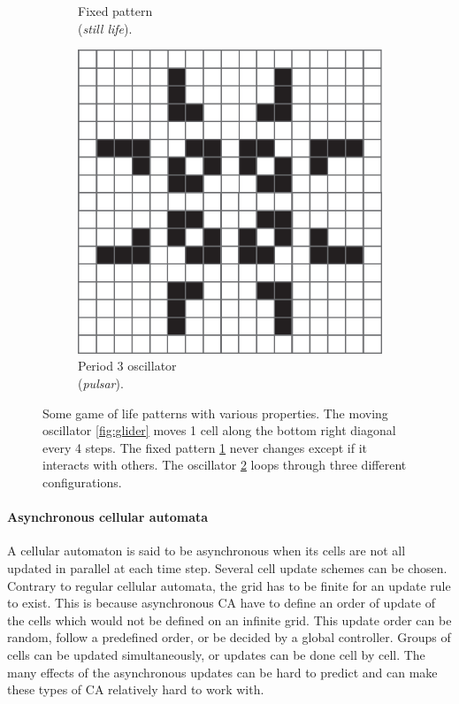 \begin{figure}[htbp]
\begin{subfigure}[t]{.31\linewidth}
    \caption{Fixed pattern\\ (\emph{still life}).}
    \label{fig:still_life}
  \end{subfigure}
  \begin{subfigure}[t]{.31\linewidth}
    \centering
    \includegraphics[width=\linewidth]{figures/pulsar.pdf}
    \caption{Period 3 oscillator\\ (\emph{pulsar}).}
    \label{fig:pulsar}
  \end{subfigure}

  \caption{Some game of life patterns with various properties. The moving
    oscillator \ref{fig:glider} moves 1 cell along the bottom right diagonal
    every 4 steps. The fixed pattern \ref{fig:still_life} never changes except
    if it interacts with others. The oscillator \ref{fig:pulsar} loops through
    three different configurations.}
  \label{fig:gol_patterns}
\end{figure}


\paragraph{Asynchronous cellular automata}
A cellular automaton is said to be asynchronous when its cells are not all
updated in parallel at each time step. Several cell update schemes can be
chosen. Contrary to regular cellular automata, the grid has to be finite for an
update rule to exist. This is because asynchronous \ac{CA} have to define an
order of update of the cells which would not be defined on an infinite grid.
This update order can be random, follow a predefined order, or be decided by a
global controller. Groups of cells can be updated simultaneously, or updates can
be done cell by cell. The many effects of the asynchronous updates can be hard
to predict and can make these types of \ac{CA} relatively hard to work with.

